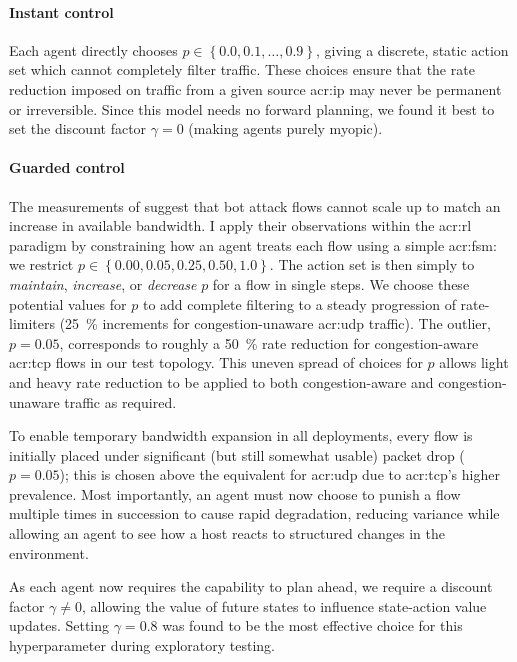 \paragraph{Instant control}
Each agent directly chooses $p \in \left\{ 0.0, 0.1, \ldots, 0.9 \right\}$, giving a discrete, static action set which cannot completely filter traffic.
These choices ensure that the rate reduction imposed on traffic from a given source \gls{acr:ip} may never be permanent or irreversible.
Since this model needs no forward planning, we found it best to set the discount factor $\gamma=0$ (making agents purely myopic).

\paragraph{Guarded control}
The measurements of \textcite{DBLP:conf/ndss/KangGS16} suggest that bot attack flows cannot scale up to match an increase in available bandwidth.
I apply their observations within the \gls{acr:rl} paradigm by constraining how an agent treats each flow using a simple \gls{acr:fsm}: we restrict $p \in \left\{ 0.00, 0.05, 0.25, 0.50, 1.0 \right\}$.
The action set is then simply to \emph{maintain}, \emph{increase}, or \emph{decrease} $p$ for a flow in single steps.
We choose these potential values for $p$ to add complete filtering to a steady progression of rate-limiters (\qty{25}{\percent} increments for congestion-unaware \gls{acr:udp} traffic).
The outlier, $p=0.05$, corresponds to roughly a \qty{50}{\percent} rate reduction for congestion-aware \gls{acr:tcp} flows in our test topology.
This uneven spread of choices for $p$ allows light and heavy rate reduction to be applied to both congestion-aware and congestion-unaware traffic as required.

To enable temporary bandwidth expansion in all deployments, every flow is initially placed under significant (but still somewhat usable) packet drop ($p=0.05$); this is chosen above the equivalent for \gls{acr:udp} due to \gls{acr:tcp}'s higher prevalence.
Most importantly, an agent must now choose to punish a flow multiple times in succession to cause rapid degradation, reducing variance while allowing an agent to see how a host reacts to structured changes in the environment.

As each agent now requires the capability to plan ahead, we require a discount factor $\gamma \ne 0$, allowing the value of future states to influence state-action value updates.
Setting $\gamma = 0.8$ was found to be the most effective choice for this hyperparameter during exploratory testing.

